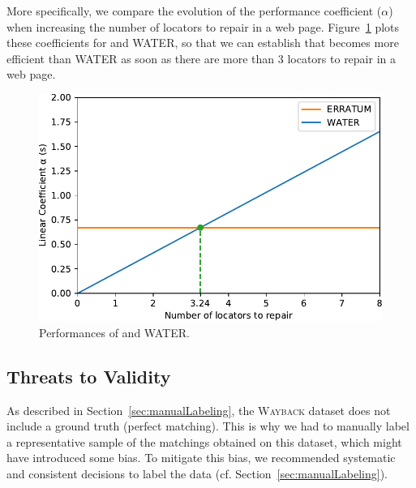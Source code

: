\documentclass[preprint, 12pt]{elsarticle}
\begin{document}
More specifically, we compare the evolution of the performance coefficient ($\alpha$) when increasing the number of locators to repair in a web page.
Figure~\ref{fig:comparisonLinearCoefficients} plots these coefficients for \erratum and WATER, so that we can establish that \erratum{} becomes more efficient than WATER as soon as there are more than 3 locators to repair in a web page.

\begin{figure}[]
  \centering
  \includegraphics[width=.75\linewidth]{linearRegression}
  \caption{Performances of \erratum and WATER.}
  \label{fig:comparisonLinearCoefficients}
\end{figure}





\subsection{Threats to Validity}\label{sec:threats}
As described in Section~\ref{sec:manualLabeling}, the \textsc{Wayback} dataset does not include a ground truth (perfect matching).
This is why we had to manually label a representative sample of the matchings obtained on this dataset, which might have introduced some bias.
To mitigate this bias, we recommended systematic and consistent decisions to label the data (cf. Section~\ref{sec:manualLabeling}). 
\end{document}
